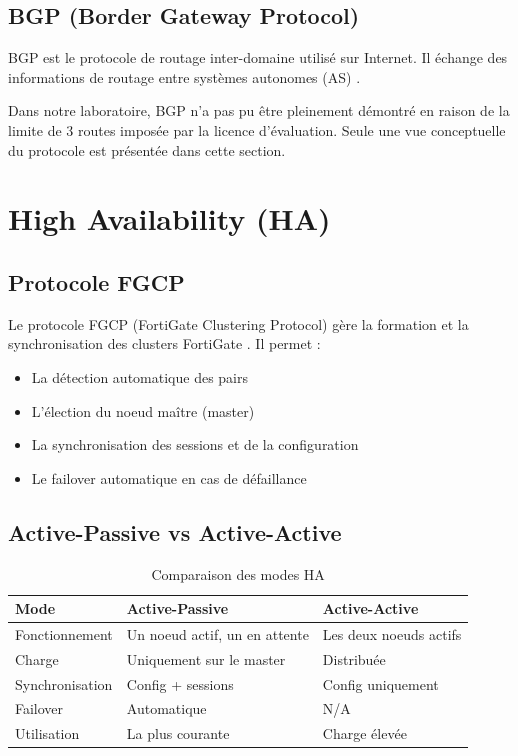 \subsection{BGP (Border Gateway Protocol)}

BGP est le protocole de routage inter-domaine utilisé sur Internet. Il échange des informations de routage entre systèmes autonomes (AS) \cite{10}.

Dans notre laboratoire, BGP n'a pas pu être pleinement démontré en raison de la limite de 3 routes imposée par la licence d'évaluation. Seule une vue conceptuelle du protocole est présentée dans cette section.

\section{High Availability (HA)}

\subsection{Protocole FGCP}

Le protocole FGCP (FortiGate Clustering Protocol) gère la formation et la synchronisation des clusters FortiGate \cite{2}. Il permet :
\begin{itemize}
    \item La détection automatique des pairs
    \item L'élection du noeud maître (master)
    \item La synchronisation des sessions et de la configuration
    \item Le failover automatique en cas de défaillance
\end{itemize}

\subsection{Active-Passive vs Active-Active}

\begin{table}[H]
\centering
\caption{Comparaison des modes HA}
\label{tab:ha-modes}
\begin{tabularx}{\textwidth}{|l|X|X|}
\hline
\textbf{Mode} & \textbf{Active-Passive} & \textbf{Active-Active} \\
\hline
Fonctionnement & Un noeud actif, un en attente & Les deux noeuds actifs \\
\hline
Charge & Uniquement sur le master & Distribuée \\
\hline
Synchronisation & Config + sessions & Config uniquement \\
\hline
Failover & Automatique & N/A \\
\hline
Utilisation & La plus courante & Charge élevée \\
\hline
\end{tabularx}
\end{table}

